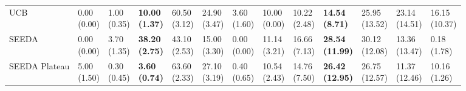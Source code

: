 \begin{table}[H]
\begin{tabular}{lllllllllllll}
UCB & \makecell{0.00 \\ (0.00)} & \makecell{1.00 \\ (0.35)} & {\cellcolor[HTML]{C8E6C9}} \bfseries \makecell{10.00 \\ (1.37)} & \makecell{60.50 \\ (3.12)} & \makecell{24.90 \\ (3.47)} & \makecell{3.60 \\ (1.60)} & \makecell{10.00 \\ (0.00)} & \makecell{10.22 \\ (2.48)} & {\cellcolor[HTML]{C8E6C9}} \bfseries \makecell{14.54 \\ (8.71)} & \makecell{25.95 \\ (13.52)} & \makecell{23.14 \\ (14.51)} & \makecell{16.15 \\ (10.37)} \\
SEEDA & \makecell{0.00 \\ (0.00)} & \makecell{3.70 \\ (1.35)} & {\cellcolor[HTML]{C8E6C9}} \bfseries \makecell{38.20 \\ (2.75)} & \makecell{43.10 \\ (2.53)} & \makecell{15.00 \\ (3.30)} & \makecell{0.00 \\ (0.00)} & \makecell{11.14 \\ (3.21)} & \makecell{16.66 \\ (7.13)} & {\cellcolor[HTML]{C8E6C9}} \bfseries \makecell{28.54 \\ (11.99)} & \makecell{30.12 \\ (12.08)} & \makecell{13.36 \\ (13.47)} & \makecell{0.18 \\ (1.78)} \\
SEEDA Plateau & \makecell{5.00 \\ (1.50)} & \makecell{0.30 \\ (0.45)} & {\cellcolor[HTML]{C8E6C9}} \bfseries \makecell{3.60 \\ (0.74)} & \makecell{63.60 \\ (2.33)} & \makecell{27.10 \\ (3.19)} & \makecell{0.40 \\ (0.65)} & \makecell{10.54 \\ (2.43)} & \makecell{14.76 \\ (7.50)} & {\cellcolor[HTML]{C8E6C9}} \bfseries \makecell{26.42 \\ (12.95)} & \makecell{26.75 \\ (12.57)} & \makecell{11.37 \\ (12.46)} & \makecell{10.16 \\ (1.26)} \\
\bottomrule
\end{tabular}
\end{table}
